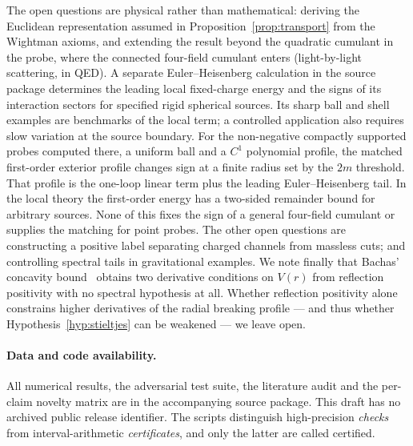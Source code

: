 \documentclass[11pt]{article}
\theoremstyle{definition}
\theoremstyle{remark}
\begin{document}
The open questions are physical rather than mathematical: deriving the
Euclidean representation assumed in Proposition~\ref{prop:transport} from the
Wightman axioms, and extending the result beyond the quadratic cumulant in
the probe, where the connected four-field cumulant enters (light-by-light
scattering, in QED). A separate Euler--Heisenberg calculation in the source
package determines the leading local fixed-charge energy and the signs of
its interaction sectors for specified rigid spherical sources. Its sharp
ball and shell examples are benchmarks of the local term; a controlled
application also requires slow variation at the source boundary. For the
non-negative compactly supported probes computed there, a uniform ball and a
$C^1$ polynomial profile, the matched first-order exterior profile changes
sign at a finite radius set by the $2m$ threshold. That profile is the
one-loop linear term plus the leading Euler--Heisenberg tail. In the local
theory the first-order energy has a two-sided remainder bound for arbitrary
sources.
None of this fixes the sign of a general four-field cumulant or supplies the
matching for point probes. The other open questions are
constructing a positive label separating charged channels from massless cuts;
and controlling spectral tails in gravitational examples. We note finally that
Bachas' concavity bound~\cite{bachas_1986} obtains two derivative conditions on
$V(r)$ from reflection positivity with no spectral hypothesis at all. Whether
reflection positivity alone constrains higher derivatives of the radial
breaking profile --- and thus whether Hypothesis~\ref{hyp:stieltjes} can be
weakened --- we leave open.

\paragraph{Data and code availability.}
All numerical results, the adversarial test suite, the literature audit and
the per-claim novelty matrix are in the accompanying source package.
This draft has no archived public release identifier. The scripts distinguish
high-precision \emph{checks} from interval-arithmetic \emph{certificates}, and
only the latter are called certified.





\end{document}
